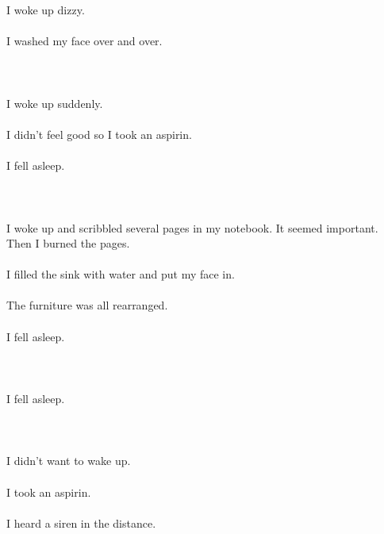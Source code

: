 \documentclass{article}
\begin{document}
    
    \section{}
    I woke up dizzy.\\\\I washed my face over and over.\\\\ 
    \newpage
    
    \section{}
    I woke up suddenly.\\\\I didn't feel good so I took an aspirin.\\\\I fell asleep.\\\\ 
    \newpage
    
    \section{}
    I woke up and scribbled several pages in my notebook. It seemed important. Then I burned the pages.\\\\I filled the sink with water and put my face in.\\\\The furniture was all rearranged.\\\\I fell asleep.\\\\ 
    \newpage
    
    \section{}
    I fell asleep.\\\\ 
    \newpage
    
    \section{}
    I didn't want to wake up.\\\\I took an aspirin.\\\\I heard a siren in the distance.\\\\ 
    \newpage
    
\end{document}
